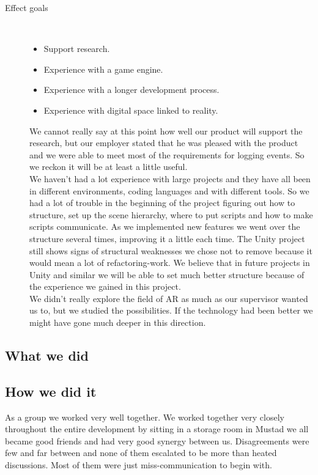 \begin{description}
	\item[Effect goals]\ 
	\begin{itemize}
		\item Support research.
		\item Experience with a game engine.
		\item Experience with a longer development process.
		\item Experience with digital space linked to reality.
	\end{itemize}
	We cannot really say at this point how well our product will support the research, but our employer stated that he was pleased with the product and we were able to meet most of the requirements for logging events. 
	So we reckon it will be at least a little useful.\\
	We haven't had a lot experience with large projects and they have all been in different environments, coding languages and with different tools. 
	So we had a lot of trouble in the beginning of the project figuring out how to structure, set up the scene hierarchy, where to put scripts and how to make scripts communicate.
	As we implemented new features we went over the structure several times, improving it a little each time. 
	The Unity project still shows signs of structural weaknesses we chose not to remove because it would mean a lot of refactoring-work. 
	We believe that in future projects in Unity and similar we will be able to set much better structure because of the experience we gained in this project.\\
	We didn't really explore the field of AR as much as our supervisor wanted us to, but we studied the possibilities. 
	If the technology had been better we might have gone much deeper in this direction.


\end{description}


\subsection{What we did}

\subsection{How we did it}
As a group we worked very well together.
We worked together very closely throughout the entire development by sitting in a storage room in Mustad we all became good friends and had very good synergy between us.
Disagreements were few and far between and none of them escalated to be more than heated discussions. Most of them were just miss-communication to begin with. 

